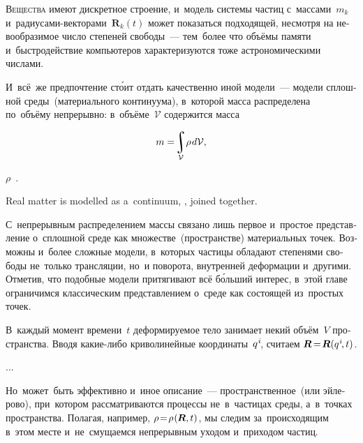 \begin{otherlanguage}{russian}

\lettrine[lines=2, findent=2pt, nindent=0pt]{В}{ещества} имеют дискретное строение, и~модель системы частиц с~массами~${m_k}$ и~радиусами\hbox{-}векторами~${\bm{R}_k (t)}$ может показаться подходящей, несмотря на невообразимое число степеней свободы~--- тем~более что объёмы памяти и~быстродействие компьютеров характеризуются тоже астрономическими числами.

И~всё~же предпочтение ст\'{о}ит отдать качественно иной модели~--- модели сплошной среды~(материального континуума), в~которой масса распределена по~объёму непрерывно: в~объёме~$\mathcal{V}$ содержится масса

\nopagebreak\vspace{-0.5em}\begin{equation}
m =\! \integral\displaylimits_{\mathcal{V}} \! \rho \hspace{0.2ex} d\mathcal{V},
\end{equation}

\vspace{-0.25em}\noindent {} $\rho$~.

Real matter is modelled as a~continuum,    , joined together.

С~непрерывным распределением массы связано лишь первое и~простое представление о~сплошной среде как множестве~(пространстве) материальных точек. Возможны и~более сложные модели, в~которых частицы обладают степенями свободы не~только трансляции, но~и поворота, внутренней деформации и~другими. Отметив, что подобные модели притягивают всё б\'{о}льший интерес, в~этой главе ограничимся классическим представлением о~среде как состоящей из~простых точек.

В~каждый момент времени~$t$ деформируемое тело занимает некий объём~$V$ пространства. Вводя какие\hbox{-}либо криволинейные координаты~${q^{\hspace{.1ex}i}\hspace{-0.4ex}}$, считаем ${\bm{R} \hspace{-0.25ex} = \hspace{-0.4ex} \bm{R}(q^{\hspace{.1ex}i} \hspace{-0.3ex}, t)}$.

...


Но~может~быть эффективно и~иное описание~--- пространственное~(или эйлерово), при~котором рассматриваются процессы не~в~частицах среды, а~в~точках пространства. Полагая, например, ${\rho \!=\! \rho \hspace{.16ex} (\hspace{-0.1ex}\bm{R}, t)}$, мы следим за~происходящим в~этом месте и~не~смущаемся непрерывным уходом и~приходом частиц.

\end{otherlanguage}

